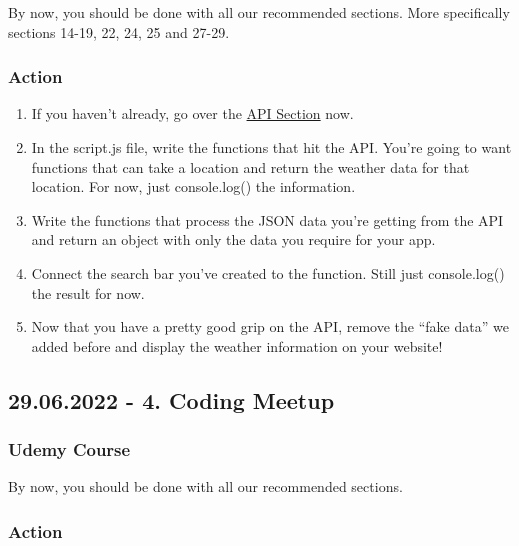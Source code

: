 \documentclass[
]{book}
\providecommand{\tightlist}{%
  \setlength{\itemsep}{0pt}\setlength{\parskip}{0pt}}
\begin{document}
By now, you should be done with all our recommended sections. More specifically sections 14-19, 22, 24, 25 and 27-29.

\hypertarget{action-2}{%
\subsubsection*{Action}\label{action-2}}

\begin{enumerate}
\def\labelenumi{\arabic{enumi}.}
\tightlist
\item
  If you haven't already, go over the \protect\hyperlink{api}{API Section} now.
\item
  In the script.js file, write the functions that hit the API. You're going to want functions that can take a location and return the weather data for that location. For now, just console.log() the information.
\item
  Write the functions that process the JSON data you're getting from the API and return an object with only the data you require for your app.
\item
  Connect the search bar you've created to the function. Still just console.log() the result for now.
\item
  Now that you have a pretty good grip on the API, remove the ``fake data'' we added before and display the weather information on your website!
\end{enumerate}

\hypertarget{coding-meetup-3}{%
\subsection*{29.06.2022 - 4. Coding Meetup}\label{coding-meetup-3}}

\hypertarget{udemy-course-3}{%
\subsubsection*{Udemy Course}\label{udemy-course-3}}

By now, you should be done with all our recommended sections.

\hypertarget{action-3}{%
\subsubsection*{Action}\label{action-3}}
\end{document}

